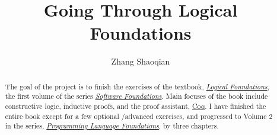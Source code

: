 \documentclass[screen,sigplan]{acmart}\settopmatter{printfolios=true,printccs=false,printacmref=false}
\begin{document}
\title[ZSQLF]{Going Through Logical Foundations}         %



\author{Zhang Shaoqian}

\begin{abstract}
The goal of the project is to finish the exercises of the textbook,
\href{https://softwarefoundations.cis.upenn.edu/current/lf-current/index.html}{\emph{Logical Foundations}}, the
first volume of the series
\href{https://softwarefoundations.cis.upenn.edu/current/index.html}{\emph{Software Foundations}}.
Main focuses of the book include constructive logic, inductive proofs, and the proof assistant,
\href{https://coq.inria.fr/}{Coq}.
I have finished the entire book except for a few optional \slash advanced exercises, and progressed to
Volume 2 in the series, 
\href{https://softwarefoundations.cis.upenn.edu/current/plf-current/index.html}{\emph{Programming Language Foundations}},
by three chapters.
\end{abstract}


\maketitle
\end{document}
